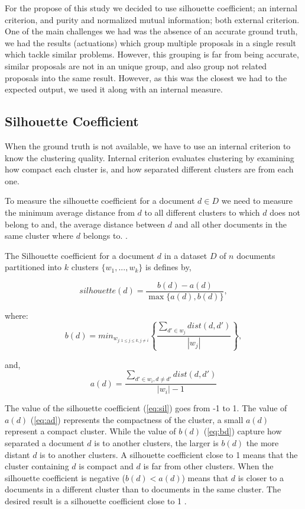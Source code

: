 For the propose of this study we decided to use silhouette coefficient; an internal criterion, and purity and normalized mutual information; both external criterion. One of the main challenges we had was the absence of an accurate ground truth, we had the results (actuations) which group multiple proposals in a single result which tackle similar problems. However, this grouping is far from being accurate, similar proposals are not in an unique group, and also group not related proposals into the same result. However, as this was the closest we had to the expected output, we used it along with an internal measure.
 

\subsection{Silhouette Coefficient}
When the ground truth is not available, we have to use an internal criterion to know the clustering quality. Internal criterion evaluates clustering by examining how compact each cluster is, and how separated different clusters are from each one\cite{han2012mining}.

To measure the silhouette coefficient for a document $d \in D$ we need to measure the minimum average distance from $d$ to all different clusters to which $d$ does not belong to and, the average distance between $d$ and all other documents in the same cluster where $d$ belongs to. \cite{han2012mining}.

The Silhouette coefficient for a document $d$ in a dataset $D$ of $n$ documents partitioned into $k$ clusters $\{w_1,...,w_k\}$  is defines by,

\begin{equation}
silhouette(d) = \frac{b(d) - a(d)}{\max{\{a(d), b(d)\}}},
\label{eq:sil}
\end{equation}

where:
\begin{equation}
b(d) = min_{w_{j:1\leq j \leq k, j\neq i}}{\left \{ \frac{\sum_{d'\in w_j} dist(d, d')}{|w_j|} \right \}},
\label{eq:bd}
\end{equation}

and,
\begin{equation}
a(d) = \frac{\sum_{d' \in w_i, d\neq d'} dist(d,d')}{|w_i|-1  }
\label{eq:ad}
\end{equation}

The value of the silhouette coefficient (\ref{eq:sil}) goes from -1 to 1. The value of $a(d)$ (\ref{eq:ad}) represents the compactness of the cluster, a small $a(d)$ represent a compact cluster. While the value of $b(d)$ (\ref{eq:bd}) capture how separated a document $d$ is to another clusters, the larger is $b(d)$ the more distant $d$ is to another clusters. A silhouette coefficient close to 1 means that the cluster containing $d$ is compact and $d$ is far from other clusters. When the silhouette coefficient  is negative ($b(d) < a(d)$) means that $d$ is closer to a documents in a different cluster than to documents in the same cluster. The desired result is a silhouette coefficient close to 1 \cite{han2012mining}.

